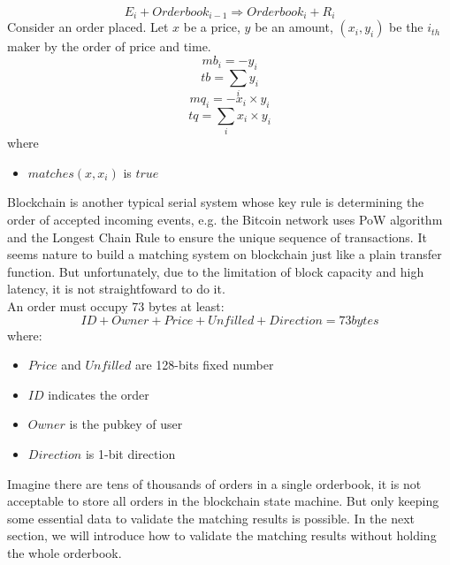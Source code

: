 \documentclass[a4paper,12pt]{article}
\begin{document}
\begin{equation*}
    E_{i} + Orderbook_{i-1} \Rightarrow Orderbook_{i} + R_{i}
\end{equation*}
Consider an order placed. Let \(x\) be a price, \(y\) be an amount,  \((x_{i}, y_{i})\) be the \(i_{th}\) maker by the order of price and time.\\
\begin{equation*}
    mb_{i}=-y_{i}
\end{equation*}
\begin{equation*}
    tb=\sum\limits_{i} y_{i}
\end{equation*}
\begin{equation*}
    mq_{i}=-x_{i} \times y_{i}
\end{equation*}
\begin{equation*}
    tq=\sum\limits_{i} x_{i} \times y_{i}
\end{equation*}
where\\
\begin{itemize}
    \item $matches(x, x_{i})$ is $true$
\end{itemize}
Blockchain is another typical serial system whose key rule is determining the order of accepted incoming events, e.g. the Bitcoin network uses PoW algorithm and the Longest Chain Rule to ensure the unique sequence of transactions. It seems nature to build a matching system on blockchain just like a plain transfer function. But unfortunately, due to the limitation of block capacity and high latency, it is not straightfoward to do it.\\
An order must occupy 73 bytes at least:\\
\begin{equation*}
ID + Owner + Price + Unfilled + Direction = 73 bytes
\end{equation*}
where:\\
\begin{itemize}
    \item $Price$ and $Unfilled$ are 128-bits fixed number
    \item $ID$ indicates the order
    \item $Owner$ is the pubkey of user
    \item $Direction$ is 1-bit direction
\end{itemize}
Imagine there are tens of thousands of orders in a single orderbook, it is not acceptable to store all orders in the blockchain state machine. But only keeping some essential data to validate the matching results is possible. In the next section, we will introduce how to validate the matching results without holding the whole orderbook.\\
\end{document}
